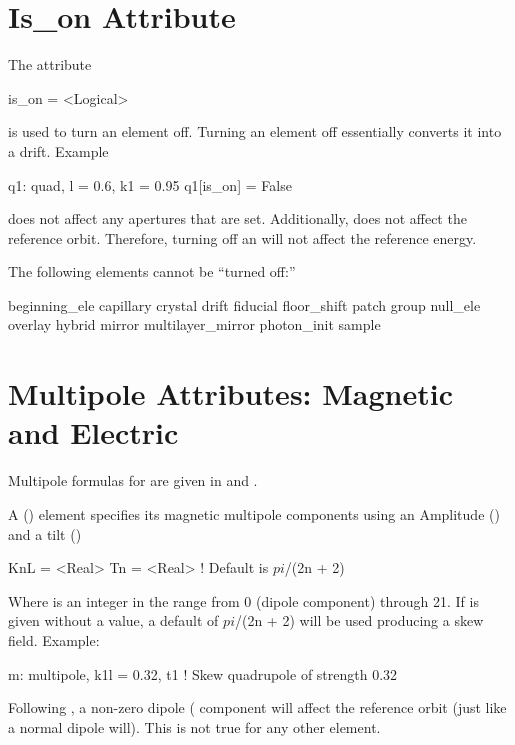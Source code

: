 \section{Is_on Attribute}
\label{s:is.on}

The  attribute
\begin{example}
  is_on = <Logical>
\end{example}
is used to turn an element off. Turning
an element off essentially converts it into a drift.
Example
\begin{example}
  q1: quad, l = 0.6, k1 = 0.95
  q1[is_on] = False
\end{example}

 does not affect any apertures that are set. Additionally,
 does not affect the reference orbit. Therefore, turning 
off an  will not affect the reference energy.

The following elements cannot be ``turned off:''
\begin{example}
  beginning_ele
  capillary
  crystal
  drift
  fiducial
  floor_shift
  patch
  group
  null_ele
  overlay
  hybrid
  mirror
  multilayer_mirror
  photon_init
  sample
\end{example}


\section{Multipole Attributes: Magnetic and Electric}
\label{s:multip}

Multipole formulas for are given in  and
.

A  () element specifies its magnetic
multipole components using an Amplitude () and a tilt
()
\begin{example}
  KnL = <Real>
  Tn  = <Real>  ! Default is $pi$/(2n + 2)
\end{example}
Where  is an integer in the range from 0 (dipole component)
through 21.  If  is given without a value, a default of
$pi$/(2n + 2) will be used producing a skew field. Example:
\begin{example}
  m: multipole, k1l = 0.32, t1  ! Skew quadrupole of strength 0.32
\end{example}
Following , a non-zero dipole ( component will affect
the reference orbit (just like a normal dipole will). This is not true
for any other element.

